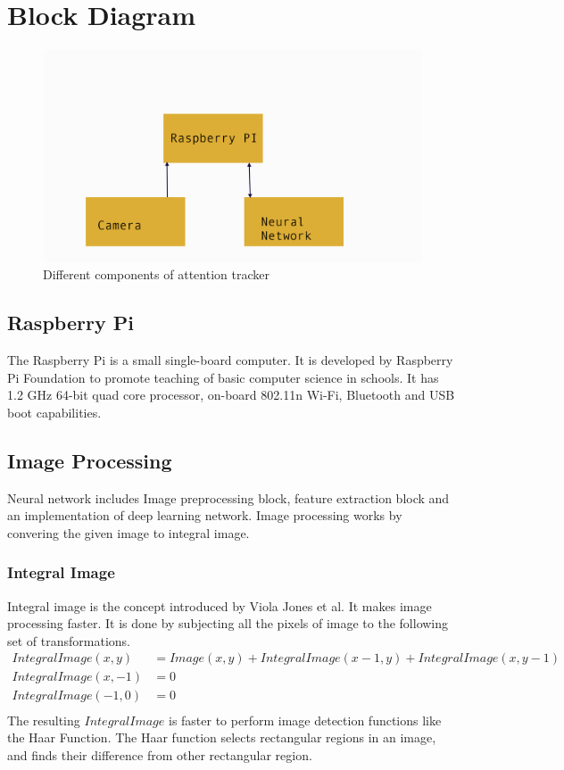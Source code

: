 \section{Block Diagram}
\begin{figure}[ht]
\centering
\includegraphics[scale=0.7]{block}
\caption{Different components of attention tracker}
\end{figure}

\subsection{Raspberry Pi}
The Raspberry Pi is a small single-board computer. It is developed by Raspberry Pi Foundation to promote teaching of basic computer science in schools. It has  1.2 GHz 64-bit quad core processor, on-board 802.11n Wi-Fi, Bluetooth and USB boot capabilities. 

\subsection{Image Processing}
Neural network includes Image preprocessing block, feature extraction block and an implementation of deep learning network. Image processing works by convering the given image to integral image.

\subsubsection{Integral Image}
Integral image is the concept introduced by Viola Jones et al. It makes image processing faster. It is done by subjecting all the pixels of image to the following set of transformations.
\begin{align*}
    IntegralImage(x,y) &=Image(x,y)+IntegralImage(x-1,y)+IntegralImage(x,y-1)\\
    IntegralImage(x,-1) &=0\\
    IntegralImage(-1,0) &=0\\
\end{align*}
The resulting $IntegralImage$ is faster to perform image detection functions like the Haar Function. The Haar function selects rectangular regions in an image, and finds their difference from other
rectangular region.

